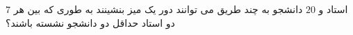 \exercise
$7$
استاد و 
$20$
دانشجو به چند طریق می توانند دور یک میز بنشینند به طوری که بین هر دو استاد حداقل دو دانشجو نشسته باشند؟